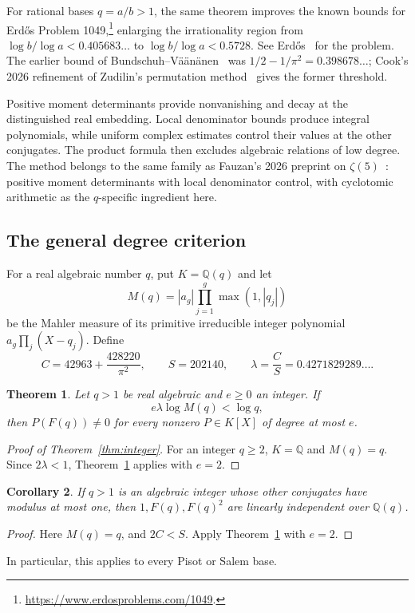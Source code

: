 \documentclass[12pt]{article}
\newtheorem{theorem}{Theorem}[section]
\newtheorem{corollary}[theorem]{Corollary}
\theoremstyle{remark}
\newcommand{\Q}{\mathbb Q}
\begin{document}
For rational bases $q=a/b>1$, the same theorem improves the known bounds for
Erd\H{o}s Problem 1049,\footnote{\url{https://www.erdosproblems.com/1049}.}
enlarging the irrationality region from $\log b/\log a<0.405683\ldots$ to
$\log b/\log a<0.5728$. See Erd\H{o}s~\cite[p.~102]{erdos} for the problem.
The earlier bound of
Bundschuh--V\"a\"an\"anen~\cite[Theorem~2]{bundschuh-vaananen} was
$1/2-1/\pi^2=0.398678\ldots$; Cook's 2026 refinement of Zudilin's
permutation method~\cite{cook,zudilin} gives the former threshold.

Positive moment determinants provide nonvanishing and decay at the distinguished
real embedding. Local denominator bounds produce integral polynomials, while
uniform complex estimates control their values at the other conjugates.
The product formula then excludes algebraic relations of low degree.
The method belongs to the same family as Fauzan's 2026 preprint on
$\zeta(5)$~\cite{fauzan}: positive moment determinants with local denominator
control, with cyclotomic arithmetic as the $q$-specific ingredient here.

\subsection{The general degree criterion}

For a real algebraic number $q$, put $K=\Q(q)$ and let
\[
M(q)=|a_g|\prod_{j=1}^{g}\max(1,|q_j|)
\]
be the Mahler measure of its primitive irreducible integer polynomial
$a_g\prod_j(X-q_j)$. Define
\begin{equation}\label{eq:constants}
C=42963+\frac{428220}{\pi^2},\qquad S=202140,\qquad
\lambda=\frac CS=0.4271829289\ldots.
\end{equation}

\begin{theorem}\label{thm:algebraic}
Let $q>1$ be real algebraic and $e\geq0$ an integer. If
\begin{equation}\label{eq:algmargin}
e\lambda\log M(q)<\log q,
\end{equation}
then $P(F(q))\ne0$ for every nonzero $P\in K[X]$ of degree at most $e$.
\end{theorem}

\begin{proof}[Proof of Theorem~\ref{thm:integer}]
For an integer $q\geq2$, $K=\Q$ and $M(q)=q$. Since $2\lambda<1$,
Theorem~\ref{thm:algebraic} applies with $e=2$.
\end{proof}

\begin{corollary}\label{cor:conjugates}
If $q>1$ is an algebraic integer whose other conjugates have modulus at most one, then $1,F(q),F(q)^2$ are linearly independent over $\Q(q)$.
\end{corollary}
\begin{proof}
Here $M(q)=q$, and $2C<S$. Apply Theorem~\ref{thm:algebraic} with $e=2$.
\end{proof}
In particular, this applies to every Pisot or Salem base.
\end{document}
